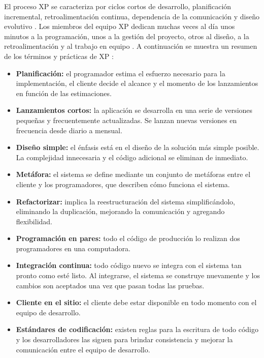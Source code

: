 \par El proceso XP se caracteriza por ciclos cortos de desarrollo, planificación incremental, retroalimentación continua, dependencia de la comunicación y diseño evolutivo \cite{BOOK10}. Los miembros del equipo XP dedican muchas veces al día unos minutos a la programación, unos a la gestión del proyecto, otros al diseño, a la retroalimentación y al trabajo en equipo \cite{BOOK09}. A continuación se muestra un resumen de los términos y prácticas de XP \cite{BOOK09,BOOK10}:
\begin{itemize}
    \item \textbf{Planificación:} el programador estima el esfuerzo necesario para la implementación, el cliente decide el alcance y el momento de los lanzamientos en función de las estimaciones.
    \item \textbf{Lanzamientos cortos:} la aplicación se desarrolla en una serie de versiones pequeñas y frecuentemente actualizadas. Se lanzan nuevas versiones en frecuencia desde diario a mensual.
    \item \textbf{Diseño simple:} el énfasis está en el diseño de la solución más simple posible. La complejidad innecesaria y el código adicional se eliminan de inmediato.
    \item \textbf{Metáfora:} el sistema se define mediante un conjunto de metáforas entre el cliente y los programadores, que describen cómo funciona el sistema.
    \item \textbf{Refactorizar:} implica la reestructuración del sistema simplificándolo, eliminando la duplicación, mejorando la comunicación y agregando flexibilidad.
    \item \textbf{Programación en pares:} todo el código de producción lo realizan dos programadores en una computadora.
    \item \textbf{Integración continua:} todo código nuevo se integra con el sistema tan pronto como esté listo. Al integrarse, el sistema se construye nuevamente y los cambios son aceptados una vez que pasan todas las pruebas.
    \item \textbf{Cliente en el sitio:} el cliente debe estar disponible en todo momento con el equipo de desarrollo.
    \item \textbf{Estándares de codificación:} existen reglas para la escritura de todo código y los desarrolladores las siguen para brindar consistencia y mejorar la comunicación entre el equipo de desarrollo.
\end{itemize}

